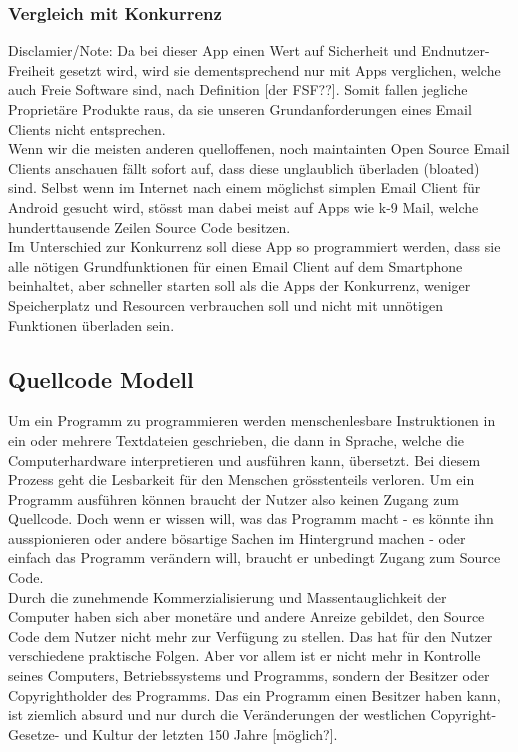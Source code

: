 \documentclass[a4paper,11pt]{article}
\begin{document}
\subsubsection{Vergleich mit Konkurrenz}
Disclamier/Note: Da bei dieser App einen Wert auf Sicherheit und Endnutzer-Freiheit gesetzt wird, wird sie dementsprechend nur mit Apps verglichen, welche auch Freie Software sind, nach Definition [der FSF??]. Somit fallen jegliche Proprietäre Produkte raus, da sie unseren Grundanforderungen eines Email Clients nicht entsprechen.\\

Wenn wir die meisten anderen quelloffenen, noch maintainten Open Source Email Clients anschauen fällt sofort auf, 
dass diese unglaublich überladen (bloated) sind. Selbst wenn im Internet nach einem möglichst simplen Email Client für Android gesucht wird, 
stösst man dabei meist auf Apps wie k-9 Mail, welche hunderttausende Zeilen Source Code besitzen.\\

Im Unterschied zur Konkurrenz soll diese App so programmiert werden, dass sie alle nötigen Grundfunktionen für einen Email Client auf dem Smartphone beinhaltet, 
aber schneller starten soll als die Apps der Konkurrenz, weniger Speicherplatz und Resourcen verbrauchen soll und nicht mit unnötigen Funktionen überladen sein.

\subsection{Quellcode Modell}
Um ein Programm zu programmieren werden menschenlesbare Instruktionen in ein oder mehrere Textdateien geschrieben,
die dann in Sprache, welche die Computerhardware interpretieren und ausführen kann, übersetzt. 
Bei diesem Prozess geht die Lesbarkeit für den Menschen grösstenteils verloren. Um ein Programm ausführen können braucht der Nutzer also keinen Zugang zum Quellcode. Doch wenn er wissen will, was das Programm macht - es könnte ihn ausspionieren oder andere bösartige Sachen im Hintergrund machen - oder einfach das Programm verändern will, braucht er unbedingt Zugang zum Source Code.\\

Durch die zunehmende Kommerzialisierung und Massentauglichkeit der Computer haben sich aber monetäre und andere Anreize gebildet, den Source Code dem Nutzer nicht mehr zur Verfügung zu stellen. Das hat für den Nutzer verschiedene praktische Folgen. Aber vor allem ist er nicht mehr in Kontrolle seines Computers, Betriebssystems und Programms, sondern der Besitzer oder Copyrightholder des Programms. Das ein Programm einen Besitzer haben kann, ist ziemlich absurd und nur durch die Veränderungen der westlichen Copyright- Gesetze- und Kultur der letzten 150 Jahre [möglich?].\\
\end{document}
